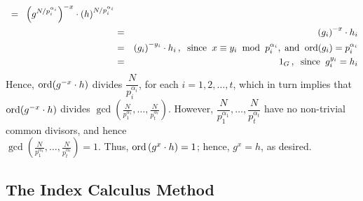 \begin{itemize}
{\begin{eqnarray*}
		\;\;=\;\; \left(g^{N/p_{i}^{\alpha_{i}}}\right)^{-x} \cdot \left(h\right)^{N/p_{i}^{\alpha_{i}}} \\
		&=& \left(g_{i}\right)^{-x} \cdot h_{i} \\
		&=& \left(g_{i}\right)^{-y_{i}} \cdot h_{i}\,,
			\;\;\textnormal{since}\;\; x \equiv y_{i}\;\;\textnormal{mod}\;\;p_{i}^{\alpha_{i}},
			\;\textnormal{and}\;\;\textnormal{ord}(g_{i}) = p_{i}^{\alpha_{i}} \\
		&=& 1_{G}\,,\;\;\textnormal{since}\;\;g_{i}^{y_{i}} = h_{i}\\
		\end{eqnarray*}
		Hence, $\textnormal{ord}(g^{-x}\cdot h)$ divides $\dfrac{N}{p_{i}^{\alpha_{i}}}$, for each $i = 1,2,\ldots,t$,
		which in turn implies that
		$\textnormal{ord}(g^{-x}\cdot h)$ divides $\gcd\left(\frac{N}{p_{1}^{\alpha_{1}}},\ldots,\frac{N}{p_{t}^{\alpha_{t}}}\right)$.
		However, $\dfrac{N}{p_{1}^{\alpha_{1}}},\ldots,\dfrac{N}{p_{t}^{\alpha_{t}}}$ have no non-trivial common divisors,
		and hence\\ $\gcd\left(\frac{N}{p_{1}^{\alpha_{1}}},\ldots,\frac{N}{p_{t}^{\alpha_{t}}}\right) = 1$.
		Thus, $\textnormal{ord}\left(g^{x}\cdot h\right) = 1$; hence, $g^{x} = h$, as desired.
		}

\end{itemize}

\subsection{The Index Calculus Method}



